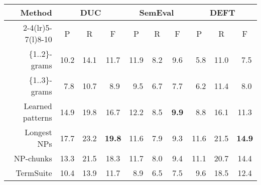       \begin{table*}
        \centering
        \begin{tabular}{@{~}rccccccccc@{~}}
          \toprule
          \multirow{2}{*}[-2pt]{\textbf{Method}} & \multicolumn{3}{c}{\textbf{DUC}} & \multicolumn{3}{c}{\textbf{SemEval}} & \multicolumn{3}{c}{\textbf{DEFT}}\\
          \cmidrule(r){2-4}\cmidrule(lr){5-7}\cmidrule(l){8-10}
          & P & R & F & P & R & F & P & R & F\\
          \midrule
          \{1..2\}-grams & 10.2 & 14.1 & 11.7 & 11.9 & $~~$8.2 & $~~$9.6 & $~~$5.8 & 11.0 & $~~$7.5\\
          \{1..3\}-grams & $~~$7.8 & 10.7 & $~~$8.9 & $~~$9.5 & $~~$6.7 & $~~$7.7 & $~~$6.2 & 11.4 & $~~$8.0\\
          Learned patterns & 14.9 & 19.8 & 16.7 & 12.2 & $~~$8.5 & \textbf{$~~$9.9} & $~~$8.8 & 16.1 & 11.3\\
          Longest NPs & 17.7 & 23.2 & \textbf{19.8} & 11.6 & $~~$7.9 & $~~$9.3 & 11.6 & 21.5 & \textbf{14.9}\\
          NP-chunks & 13.3 & 21.5 & 18.3 & 11.7 & $~~$8.0 & $~~$9.4 & 11.1 & 20.7 & 14.4\\
          TermSuite & 10.4 & 13.9 & 11.7 & $~~$8.9 & $~~$6.5 & $~~$7.5 & $~~$9.6 & 18.5 & 12.4\\
          \bottomrule
        \end{tabular}
        \caption{Comparison of candidate extraction methods, when extracting 10
                 keyphrases with \textbf{TopicRank}.
                 \label{tab:topicrank_results}}
      \end{table*}

